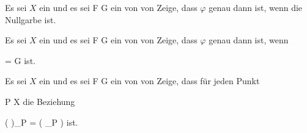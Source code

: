 {}
{





Es sei $X$ ein
und es sei
\maabb {\varphi} { { \mathcal  F   } } { { \mathcal  G   }
} {}
ein
von
von
Zeige, dass $\varphi$ genau dann
ist, wenn
 die Nullgarbe ist.





}
{} {}

{}
{





Es sei $X$ ein
und es sei
\maabb {\varphi} { { \mathcal  F   } } { { \mathcal  G   }
} {}
ein
von
von
Zeige, dass $\varphi$ genau dann
ist, wenn

\mavergleichskette
{\vergleichskette
{  \varphi
}
{ = }{ { \mathcal  G   }
}
{  }{
}
{    }{
}
{   }{
}
}
{}{}{}
ist.





}
{} {}

{}
{





Es sei $X$ ein
und es sei
\maabb {\varphi} { { \mathcal  F   } } { { \mathcal  G   }
} {}
ein
von
von
Zeige, dass für jeden Punkt

\mavergleichskette
{\vergleichskette
{P
}
{ \in }{ X
}
{  }{
}
{    }{
}
{   }{
}
}
{}{}{}
die Beziehung

\mavergleichskette
{\vergleichskette
{ \left(   \varphi  \right)_P
}
{ = }{   \left(  \varphi_P   \right)
}
{  }{
}
{    }{
}
{   }{
}
}
{}{}{}
ist.





}
{} {}

